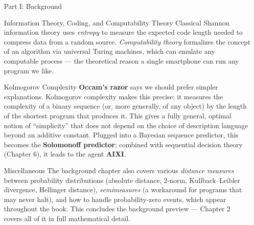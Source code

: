 \documentclass[aspectratio=169,10pt]{beamer}
\begin{document}
\begin{frame}[allowframebreaks]{Part I: Background}
  \framebreak

  \begin{block}{Information Theory, Coding, and Computability Theory}
    Classical Shannon information theory uses \emph{entropy} to measure the
    expected code length needed to compress data from a random source.
    \emph{Computability theory} formalizes the concept of an algorithm via
    universal Turing machines, which can emulate any computable process ---
    the theoretical reason a single smartphone can run any program we like.
  \end{block}

  \begin{block}{Kolmogorov Complexity}
    \textbf{Occam's razor} says we should prefer simpler explanations.
    Kolmogorov complexity makes this precise: it measures the complexity of
    a binary sequence (or, more generally, of any object) by the length of
    the shortest program that produces it. This gives a fully general,
    optimal notion of ``simplicity'' that does not depend on the choice of
    description language beyond an additive constant. Plugged into a
    Bayesian sequence predictor, this becomes the \textbf{Solomonoff
    predictor}; combined with sequential decision theory (Chapter 6), it
    leads to the agent \textbf{AIXI}.
  \end{block}

  \begin{block}{Miscellaneous}
    The background chapter also covers various \emph{distance measures}
    between probability distributions (absolute distance, 2-norm,
    Kullback--Leibler divergence, Hellinger distance), \emph{semimeasures}
    (a workaround for programs that may never halt), and how to handle
    probability-zero events, which appear throughout the book. This
    concludes the background preview --- Chapter 2 covers all of it in
    full mathematical detail.
  \end{block}
\end{frame}
\end{document}
